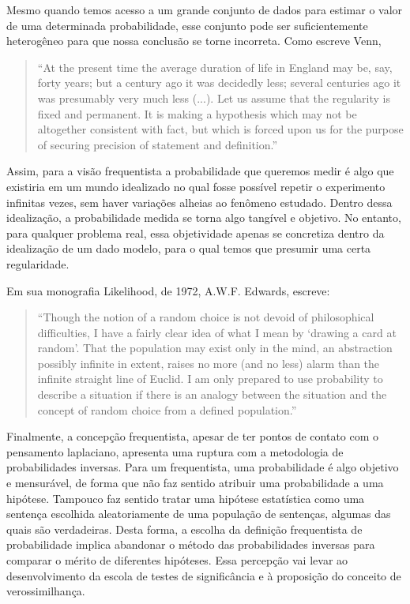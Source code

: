 Mesmo quando temos acesso a um grande conjunto de dados para estimar o valor de uma determinada
probabilidade, esse conjunto pode ser suficientemente heterogêneo para que nossa conclusão se torne incorreta. Como escreve Venn,

\begin{quote}
``At the present time the average duration of life in England may be, say, forty years; but a century ago it was decidedly less;
several centuries ago it was presumably very much less (...). Let us assume that the regularity is fixed and permanent. It is
making a hypothesis which may not be altogether consistent with fact, but which is forced upon us for the purpose of securing
precision of statement and definition.''\citep{Venn1866}
\end{quote}

Assim, para a visão frequentista a probabilidade que queremos medir é algo que existiria em um mundo idealizado no qual fosse
possível repetir o experimento infinitas vezes, sem haver variações alheias ao fenômeno estudado. Dentro dessa idealização,
a probabilidade medida se torna algo tangível e objetivo. No entanto, para qualquer problema real, essa objetividade
apenas se concretiza dentro da idealização de um dado modelo, para o qual temos que presumir uma certa regularidade. 

Em sua monografia Likelihood, de 1972, A.W.F. Edwards, escreve:

\begin{quote}
``Though the notion of a random choice is not devoid of philosophical difficulties, I have a fairly clear idea of what I mean
by `drawing a card at random'. That the population may exist only in the mind, an abstraction possibly infinite in extent,
raises no more (and no less) alarm than the infinite straight line of Euclid. I am only prepared to use probability to describe
a situation if there is an analogy between the situation and the concept of random choice from a defined population.''
\citep{Edwards72}
\end{quote}

Finalmente, a concepção frequentista, apesar de ter pontos de contato com o pensamento laplaciano, apresenta
uma ruptura com a metodologia de probabilidades inversas. Para um frequentista, uma probabilidade é algo objetivo
e mensurável, de forma que não faz sentido atribuir uma probabilidade a uma hipótese. 
Tampouco faz sentido tratar uma hipótese estatística como uma sentença escolhida aleatoriamente 
de uma população de sentenças, algumas das quais são verdadeiras.
Desta forma, a escolha da definição frequentista de probabilidade implica abandonar o método
das probabilidades inversas para comparar o mérito de diferentes hipóteses.
Essa percepção vai levar ao desenvolvimento da escola de testes de significância e à 
proposição do conceito de verossimilhança.

